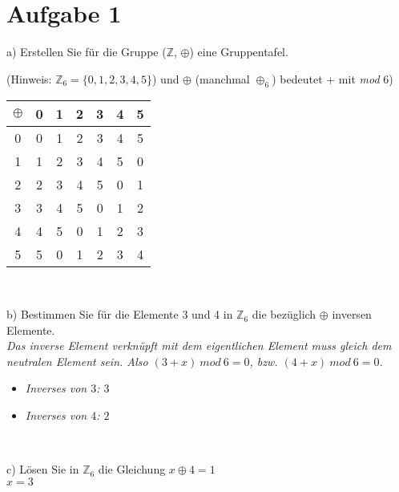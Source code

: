 \section*{Aufgabe 1}

a) Erstellen Sie für die Gruppe ($\mathbb{Z}$, $\oplus$) eine Gruppentafel.\

\hspace{0.5cm}(Hinweis: $\mathbb{Z}_6 = \{ 0,1,2,3,4,5 \}$) und $\oplus$ (manchmal $\oplus _6$) bedeutet + mit \textit{mod} 6)\\

\begin{table}[h]
\centering
\begin{tabular}{c|cccccc}
$\oplus$ & 0 & 1 & 2 & 3 & 4 & 5\\
\hline
0 & 0 & 1 & 2 & 3 & 4 & 5\\
1 & 1 & 2 & 3 & 4 & 5 & 0\\
2 & 2 & 3 & 4 & 5 & 0 & 1\\
3 & 3 & 4 & 5 & 0 & 1 & 2\\
4 & 4 & 5 & 0 & 1 & 2 & 3\\
5 & 5 & 0 & 1 & 2 & 3 & 4\\
\end{tabular}
\end{table}\

b) Bestimmen Sie für die Elemente 3 und 4 in $\mathbb{Z}_6$ die bezüglich $\oplus$ inversen Elemente.\\

\textit{Das inverse Element verknüpft mit dem eigentlichen Element muss gleich dem neutralen Element sein. Also $(3 + x) \ mod \ 6 = 0$, bzw. $(4 + x) \ mod \ 6 = 0$.}

\begin{itemize}[leftmargin=*]
\item \textit{Inverses von $3$: $3$}
\item \textit{Inverses von $4$: $2$}
\end{itemize}\

c) Lösen Sie in $\mathbb{Z}_6$ die Gleichung $x \oplus 4 = 1$\\

$x = 3$

\newpage